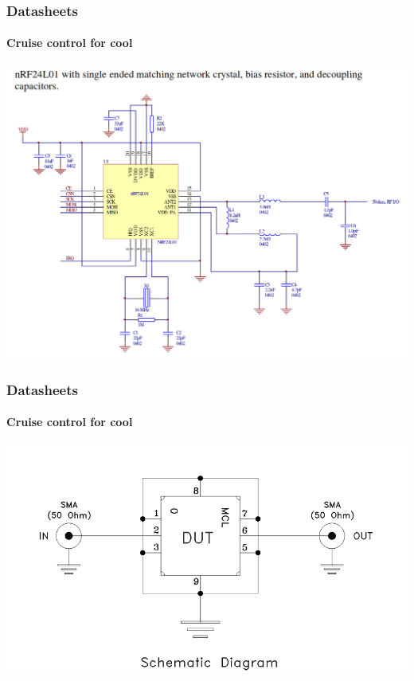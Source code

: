 \documentclass[]{beamer}
\begin{document}
\begin{frame}
    \frametitle{Datasheets}
    \framesubtitle{Cruise control for cool}
    \begin{center}
        \includegraphics[keepaspectratio,scale=0.25]{images/datasheet_complex.png}
    \end{center}
\end{frame}

\begin{frame}
    \frametitle{Datasheets}
    \framesubtitle{Cruise control for cool}
    \begin{center}
        \includegraphics[keepaspectratio,scale=0.25]{images/datasheet_schematic.png}
    \end{center}
\end{frame}
\end{document}
